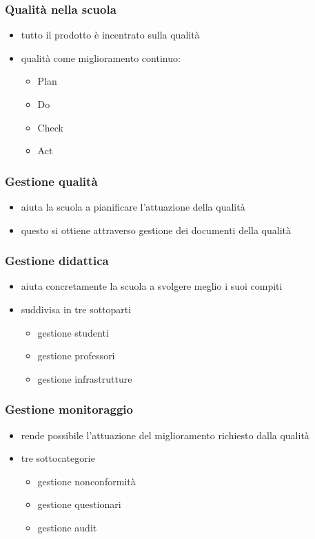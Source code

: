 \begin{frame}
\frametitle{Qualità nella scuola}

\begin{itemize}
\item tutto il prodotto è incentrato sulla \alert{qualità}
\item qualità come miglioramento continuo:

\begin{itemize}
\item Plan
\item Do
\item Check
\item Act
\end{itemize}

\end{itemize}

\end{frame}

\begin{frame}
\frametitle{Gestione qualità}

\begin{itemize}
\item aiuta la scuola a pianificare l'attuazione della qualità %
\item questo si ottiene attraverso gestione dei documenti della qualità
\end{itemize}

\end{frame}

\begin{frame}
\frametitle{Gestione didattica}

\begin{itemize}
\item aiuta concretamente la scuola a svolgere meglio i suoi compiti
\item suddivisa in tre sottoparti
\begin{itemize}
\item gestione studenti
\item gestione professori
\item gestione infrastrutture
\end{itemize}
\end{itemize}

\end{frame}

\begin{frame}
\frametitle{Gestione monitoraggio}

\begin{itemize}
\item rende possibile l'attuazione del miglioramento richiesto dalla qualità
\item tre sottocategorie
\begin{itemize}
\item gestione nonconformità
\item gestione questionari
\item gestione audit
\end{itemize}
\end{itemize}

\end{frame}

